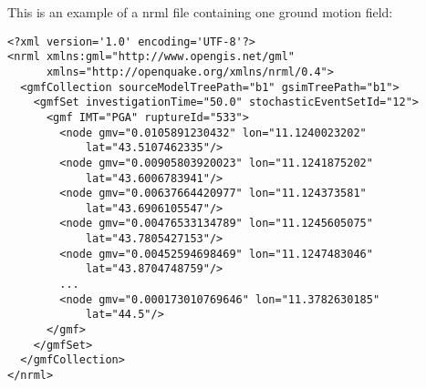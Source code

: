 This is an example of a nrml file containing one 
ground motion field:
\begin{Verbatim}[frame=single, commandchars=\\\{\}, fontsize=\small]
<?xml version='1.0' encoding='UTF-8'?>
<nrml xmlns:gml="http://www.opengis.net/gml" 
      xmlns="http://openquake.org/xmlns/nrml/0.4">
  <gmfCollection sourceModelTreePath="b1" gsimTreePath="b1">
    <gmfSet investigationTime="50.0" stochasticEventSetId="12">
      <gmf IMT="PGA" ruptureId="533">
        <node gmv="0.0105891230432" lon="11.1240023202" 
            lat="43.5107462335"/>
        <node gmv="0.00905803920023" lon="11.1241875202" 
            lat="43.6006783941"/>
        <node gmv="0.00637664420977" lon="11.124373581" 
            lat="43.6906105547"/>
        <node gmv="0.00476533134789" lon="11.1245605075" 
            lat="43.7805427153"/>
        <node gmv="0.00452594698469" lon="11.1247483046" 
            lat="43.8704748759"/>
        ...
        <node gmv="0.000173010769646" lon="11.3782630185" 
            lat="44.5"/>
      </gmf>
    </gmfSet>
  </gmfCollection>
</nrml>
\end{Verbatim}
